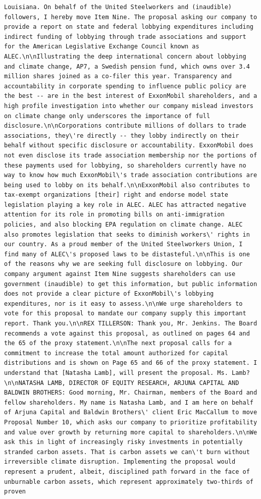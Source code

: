 \documentclass[
  letterpaper,
  DIV=11,
  numbers=noendperiod]{scrreprt}
\begin{document}
\begin{verbatim}
Louisiana. On behalf of the United Steelworkers and (inaudible) followers, I hereby move Item Nine. The proposal asking our company to provide a report on state and federal lobbying expenditures including indirect funding of lobbying through trade associations and support for the American Legislative Exchange Council known as ALEC.\n\nIllustrating the deep international concern about lobbying and climate change, AP7, a Swedish pension fund, which owns over 3.4 million shares joined as a co-filer this year. Transparency and accountability in corporate spending to influence public policy are the best -- are in the best interest of ExxonMobil shareholders, and a high profile investigation into whether our company mislead investors on climate change only underscores the importance of full disclosure.\n\nCorporations contribute millions of dollars to trade associations, they\'re directly -- they lobby indirectly on their behalf without specific disclosure or accountability. ExxonMobil does not even disclose its trade association membership nor the portions of these payments used for lobbying, so shareholders currently have no way to know how much ExxonMobil\'s trade association contributions are being used to lobby on its behalf.\n\nExxonMobil also contributes to tax-exempt organizations [their] right and endorse model state legislation playing a key role in ALEC. ALEC has attracted negative attention for its role in promoting bills on anti-immigration policies, and also blocking EPA regulation on climate change. ALEC also promotes legislation that seeks to diminish workers\' rights in our country. As a proud member of the United Steelworkers Union, I find many of ALEC\'s proposed laws to be distasteful.\n\nThis is one of the reasons why we are seeking full disclosure on lobbying. Our company argument against Item Nine suggests shareholders can use government (inaudible) to get this information, but public information does not provide a clear picture of ExxonMobil\'s lobbying expenditures, nor is it easy to assess.\n\nWe urge shareholders to vote for this proposal to mandate our company supply this important report. Thank you.\n\nREX TILLERSON: Thank you, Mr. Jenkins. The Board recommends a vote against this proposal, as outlined on pages 64 and the 65 of the proxy statement.\n\nThe next proposal calls for a commitment to increase the total amount authorized for capital distributions and is shown on Page 65 and 66 of the proxy statement. I understand that [Natasha Lamb], will present the proposal. Ms. Lamb?\n\nNATASHA LAMB, DIRECTOR OF EQUITY RESEARCH, ARJUNA CAPITAL AND BALDWIN BROTHERS: Good morning, Mr. Chairman, members of the Board and fellow shareholders. My name is Natasha Lamb, and I am here on behalf of Arjuna Capital and Baldwin Brothers\' client Eric MacCallum to move Proposal Number 10, which asks our company to prioritize profitability and value over growth by returning more capital to shareholders.\n\nWe ask this in light of increasingly risky investments in potentially stranded carbon assets. That is carbon assets we can\'t burn without irreversible climate disruption. Implementing the proposal would represent a prudent, albeit, disciplined path forward in the face of unburnable carbon assets, which represent approximately two-thirds of proven 
\end{verbatim}
\end{document}
